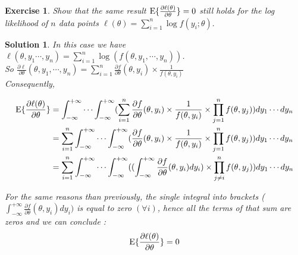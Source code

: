 \documentclass[12pt,a4paper]{article}
\newtheorem{exercise}{Exercise}
\newtheorem{solution}{Solution}
\begin{document}
\begin{exercise}
Show that the same result $\mathrm{E}\{ {\partial \ell(\theta)\over \partial \theta}\}=0$ still holds for the log likelihood of $n$ data points  $\ell(\theta)=\sum_{i=1}^n \log f(y_i;\theta).$
\end{exercise}
\begin{solution}
In this case we have $\ell(\theta, y_1 \cdots, y_n) = \sum_{i=1}^{n} \log(f(\theta, y_1, \cdots, y_n))$. \\
So $\frac{\partial \ell}{\partial \theta} (\theta, y_1, \cdots, y_n) = \sum_{i=1}^{n} \frac{\partial f}{\partial \theta} (\theta, y_i) \times \frac{1}{f(\theta, y_i)}$\\

Consequently, 
 
\begin{equation}
\begin{split}
\mathrm{E} \{ {\partial \ell(\theta)\over \partial \theta}\} & = \int_{-\infty}^{+\infty} \cdots \int_{-\infty}^{+\infty} (\sum_{i=1}^{n} \frac{\partial f}{\partial \theta} (\theta, y_i) \times \frac{1}{f(\theta, y_i)} \times \prod_{j=1}^{n}f(\theta, y_j)) dy_1 \cdots dy_n\\
 & = \sum_{i=1}^{n} \int_{-\infty}^{+\infty} \cdots \int_{-\infty}^{+\infty} (\frac{\partial f}{\partial \theta} (\theta, y_i) \times \frac{1}{f(\theta, y_i)} \times \prod_{j=1}^{n}f(\theta, y_j)) dy_1 \cdots dy_n\\ 
 & = \sum_{i=1}^{n} \int_{-\infty}^{+\infty} \cdots \int_{-\infty}^{+\infty} ((\int_{-\infty}^{+\infty} \frac{\partial f}{\partial \theta} (\theta, y_i) dy_i) \times \prod_{j \neq i}^{n}f(\theta, y_j)) dy_1 \cdots dy_n \\
\end{split}
\end{equation}

For the same reasons than previously, the single integral into brackets  ($\int_{-\infty}^{+\infty} \frac{\partial f}{\partial \theta} (\theta, y_i) dy_i)$ is equal to zero $(\forall i)$, hence all the terms of that sum are zeros and we can conclude : $$\mathrm{E} \{ {\partial \ell(\theta)\over \partial \theta}\} = 0$$
\end{solution}
\end{document}
